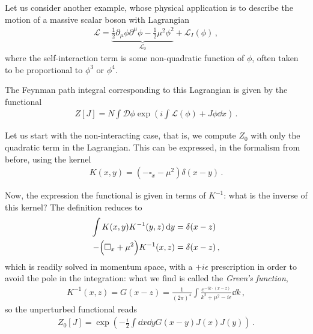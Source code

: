 \documentclass[main.tex]{subfiles}
\begin{document}
Let us consider another example, whose physical application is to describe the motion of a massive scalar boson with Lagrangian 
%
\begin{align}
\mathscr{L} = \underbrace{\frac{1}{2} \partial_{\mu } \phi \partial^{\mu } \phi - \frac{1}{2} \mu^2 \phi^2}_{\mathscr{L}_{0}}+ \mathscr{L}_I (\phi )
\,,
\end{align}
%
where the self-interaction term is some non-quadratic function of \(\phi \), often taken to be proportional to  \(\phi^3\)  or \(\phi^{4}\). 

The Feynman path integral corresponding to this Lagrangian is given by the functional 
%
\begin{align}
Z[J] = N \int \mathcal{D} \phi \exp(i \int \mathscr{L}(\phi ) +  J \phi \dd{x} )
\,.
\end{align}

Let us start with the non-interacting case, that is, we compute \(Z_0 \) with only the quadratic term in the Lagrangian. This can be expressed, in the formalism from before, using the kernel 
%
\begin{align}
K(x, y )= (- \square_x - \mu^2 ) \delta (x-y)
\,.
\end{align}

Now, the expression the functional is given in terms of \(K^{-1}\): what is the inverse of this kernel? The definition reduces to 
%
\begin{align}
\int K(x, y) K^{-1}(y, z) \dd{y} &= \delta (x-z)   \\
- \qty(\square_x + \mu^2) K^{-1} (x, z) &= \delta (x-z)
\,,
\end{align}
%
which is readily solved in momentum space, with a \(+i \epsilon \) prescription in order to avoid the pole in the integration: what we find is called the \emph{Green's function}, 
%
\begin{align}
K^{-1}(x, z) = G(x-z) = \frac{1}{(2 \pi )^{4}} \int \frac{e^{-ik \cdot (x-z)}}{k^2 + \mu^2 - i \epsilon } \dd{k} 
\,,
\end{align}
%
so the unperturbed functional reads 
%
\begin{align}
Z_0 [J] = \exp(- \frac{i}{2} \int \dd{x} \dd{y} G(x-y) J(x) J(y))
\,.
\end{align}

\end{document}
